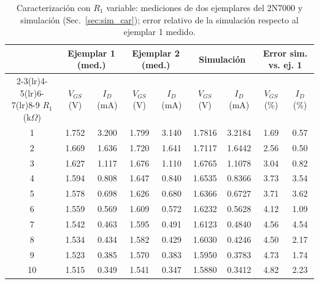 \documentclass[conference]{IEEEtran}
\begin{document}
\begin{table}[htbp]
\centering
\caption{Caracterización con $R_1$ variable: mediciones de dos ejemplares del 2N7000 y simulación (Sec.~\ref{sec:sim_car}); error relativo de la simulación respecto al ejemplar 1 medido.}
\label{tab:car}
\scriptsize
\renewcommand{\arraystretch}{1.03}
\setlength{\tabcolsep}{5pt}
\begin{tabular}{@{}ccccccccc@{}}
\toprule
 & \multicolumn{2}{c}{Ejemplar 1 (med.)} & \multicolumn{2}{c}{Ejemplar 2 (med.)} & \multicolumn{2}{c}{Simulación} & \multicolumn{2}{c}{Error sim. vs. ej. 1} \\
\cmidrule(lr){2-3}\cmidrule(lr){4-5}\cmidrule(lr){6-7}\cmidrule(lr){8-9}
$R_1$ (k$\Omega$) & $V_{GS}$ (V) & $I_D$ (mA) & $V_{GS}$ (V) & $I_D$ (mA) & $V_{GS}$ (V) & $I_D$ (mA) & $V_{GS}$ (\%) & $I_D$ (\%) \\
\midrule
1 & 1.752 & 3.200 & 1.799 & 3.140 & 1.7816 & 3.2184 & 1.69 & 0.57 \\
2 & 1.669 & 1.636 & 1.720 & 1.641 & 1.7117 & 1.6442 & 2.56 & 0.50 \\
3 & 1.627 & 1.117 & 1.676 & 1.110 & 1.6765 & 1.1078 & 3.04 & 0.82 \\
4 & 1.594 & 0.808 & 1.647 & 0.840 & 1.6535 & 0.8366 & 3.73 & 3.54 \\
5 & 1.578 & 0.698 & 1.626 & 0.680 & 1.6366 & 0.6727 & 3.71 & 3.62 \\
6 & 1.559 & 0.569 & 1.609 & 0.572 & 1.6232 & 0.5628 & 4.12 & 1.09 \\
7 & 1.542 & 0.463 & 1.595 & 0.491 & 1.6123 & 0.4840 & 4.56 & 4.54 \\
8 & 1.534 & 0.434 & 1.582 & 0.429 & 1.6030 & 0.4246 & 4.50 & 2.17 \\
9 & 1.523 & 0.385 & 1.570 & 0.383 & 1.5950 & 0.3783 & 4.73 & 1.74 \\
10 & 1.515 & 0.349 & 1.541 & 0.347 & 1.5880 & 0.3412 & 4.82 & 2.23 \\
\bottomrule
\end{tabular}
\end{table}

\end{document}
